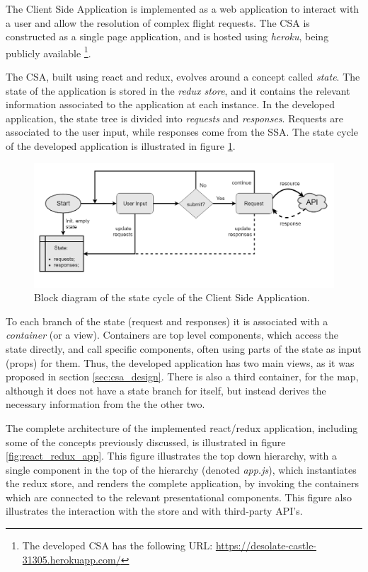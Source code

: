 The Client Side Application is implemented as a web application to interact with a user and allow the resolution of complex flight requests. The CSA is constructed as a single page application, and is hosted using \textit{heroku}, being publicly available \footnote{The developed CSA has the following URL: \url{https://desolate-castle-31305.herokuapp.com/}}.

The CSA, built using react and redux, evolves around a concept called \textit{state}. The state of the application is stored in the \textit{redux store}, and it contains the relevant information associated to the application at each instance. In the developed application, the state tree is  divided into \textit{requests} and \textit{responses}. Requests are associated to the user input, while responses come from the SSA. The state cycle of the developed application is illustrated in figure \ref{fig:app_state_cycle}.

\begin{figure}[htpb]
  \centering
  \includegraphics[width=\textwidth]{./Figures/system_implementation/state_flow.png}
  \caption{Block diagram of the state cycle of the Client Side Application.}
  \label{fig:app_state_cycle}  
\end{figure}

To each branch of the state (request and responses) it is associated with a \textit{container} (or a view). Containers are top level components, which access the state directly, and call specific components, often using parts of the state as input (props) for them. Thus, the developed application has two main views, as it was proposed in section \ref{sec:csa_design}. There is also a third container, for the map, although it does not have a state branch for itself, but instead derives the necessary information from the the other two. 

The complete architecture of the implemented react/redux application, including some of the concepts previously discussed, is illustrated in figure \ref{fig:react_redux_app}. This figure illustrates the top down hierarchy, with a single component in the top of the hierarchy (denoted \textit{app.js}), which instantiates the redux store, and renders the complete application, by invoking the containers which are connected to the relevant presentational components. This figure also illustrates the interaction with the store and with third-party API's. 

